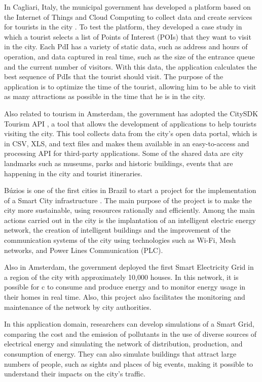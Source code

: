 In Cagliari, Italy, the municipal government has developed a platform based on the Internet of Things and Cloud Computing to collect data and create services for tourists in the city \cite{nitti2017iot}. To test the platform, they developed a case study in which a tourist selects a list of Points of Interest (POIs) that they want to visit in the city. Each PdI has a variety of static data, such as address and hours of operation, and data captured in real time, such as the size of the entrance queue and the current number of visitors. With this data, the application calculates the best sequence of PdIs that the tourist should visit. The purpose of the application is to optimize the time of the tourist, allowing him to be able to visit as many attractions as possible in the time that he is in the city.

Also related to tourism in Amsterdam, the government has adopted the CitySDK Tourism API \cite{pereira2015citysdk}, a tool that allows the development of applications to help tourists visiting the city. This tool collects data from the city's open data portal, which is in CSV, XLS, and text files and makes them available in an easy-to-access and processing API for third-party applications. Some of the shared data are city landmarks such as museums, parks and historic buildings, events that are happening in the city and tourist itineraries.


Búzios is one of the first cities in Brazil to start a project for the implementation of a Smart City infrastructure \cite{fortes2014deployment}. The main purpose of the project is to make the city more sustainable, using resources rationally and efficiently. Among the main actions carried out in the city is the implantation of an intelligent electric energy network, the creation of intelligent buildings and the improvement of the communication systems of the city using technologies such as Wi-Fi, Mesh networks, and Power Lines Communication (PLC).

Also in Amsterdam, the government deployed the first Smart Electricity Grid in a region of the city with approximately 10,000 houses. In this network, it is possible for c to consume and produce energy and to monitor energy usage in their homes in real time. Also, this project also facilitates the monitoring and maintenance of the network by city authorities.

In this application domain, researchers can develop simulations of a Smart Grid, comparing the cost and the emission of pollutants in the use of diverse sources of electrical energy and simulating the network of distribution, production, and consumption of energy. They can also simulate buildings that attract large numbers of people, such as sights and places of big events, making it possible to understand their impacts on the city's traffic.

